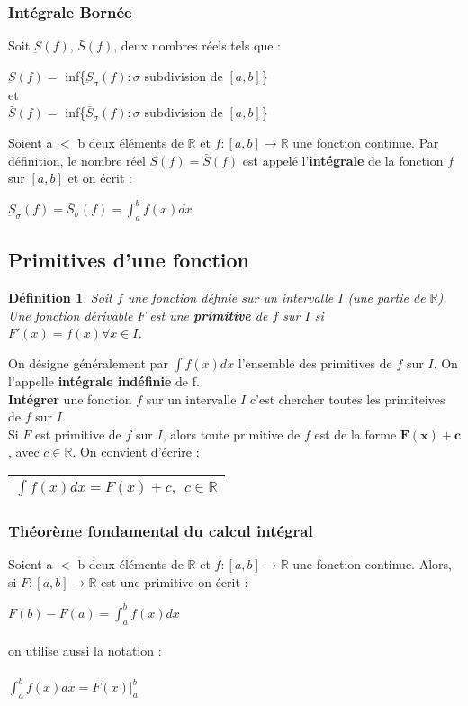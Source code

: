 \documentclass[12pt, a4paper]{book}
\newtheorem*{definition}{Définition}
\begin{document}
\subsubsection{Intégrale Bornée}
Soit $\underbar{S}(f)$, $\bar{S}(f)$, deux nombres réels tels que :\\
\begin{center}
    $\underbar{S}(f)=$ inf\{$\underbar{S}_{\sigma}(f) : \sigma$ subdivision de $[a,b]$\}\\
    et\\
    $\bar{S}(f)=$ inf\{$\bar{S}_{\sigma}(f) : \sigma$ subdivision de $[a,b]$\}
\end{center}
Soient a $<$ b deux éléments de $\mathbb{R}$ et $f:[a,b]\rightarrow \mathbb{R}$ une fonction continue. Par définition, le nombre réel $\underbar{S}(f)=\bar{S}(f)$ est
appelé l'\textbf{intégrale} de la fonction $f$ sur $[a,b]$ et on écrit :
\begin{center}
    $\underbar{S}_{\sigma}(f)=\bar{S}_{\sigma}(f) = \int_{a}^{b} f(x) dx $
\end{center}

\subsection{Primitives d'une fonction}
\begin{definition}
    Soit $f$ une fonction définie sur un intervalle $I$ (une partie de $\mathbb{R}$). Une fonction dérivable $F$ est une \textbf{primitive} de $f$ sur $I$ si\\
     $F'(x) = f(x) \forall x \in I$.
\end{definition}
On désigne généralement par $\int f(x)dx$ l'ensemble des primitives de $f$ sur $I$. On l'appelle \textbf{intégrale indéfinie} de f.\\
\textbf{Intégrer} une fonction $f$ sur un intervalle $I$ c'est chercher toutes les primiteives de $f$ sur $I$.\\
Si $F$ est primitive de $f$ sur $I$, alors toute primitive de $f$ est de la forme $\mathbf{F(x)+c}$, avec $c \in \mathbb{R}$. On convient d'écrire :\\
\begin{center}
    \begin{tabular}{ |c|}
        \hline
       $\int f(x)dx = F(x)+c, \ \ c \in \mathbb{R}$\\
        \hline
    \end{tabular}
\end{center}
\subsubsection{Théorème fondamental du calcul intégral}
Soient a $<$ b deux éléments de $\mathbb{R}$ et $f:[a,b]\rightarrow \mathbb{R}$ une fonction continue.
Alors, si $F:[a,b]\rightarrow \mathbb{R}$ est une primitive on écrit :
\begin{center}
    $F(b)-F(a)=\int_{a}^{b} f(x) dx$\\
    \ \\
    on utilise aussi la notation :\\
    \ \\
    $\int_{a}^{b} f(x) dx = F(x)|^b _a$
\end{center}
\end{document}
